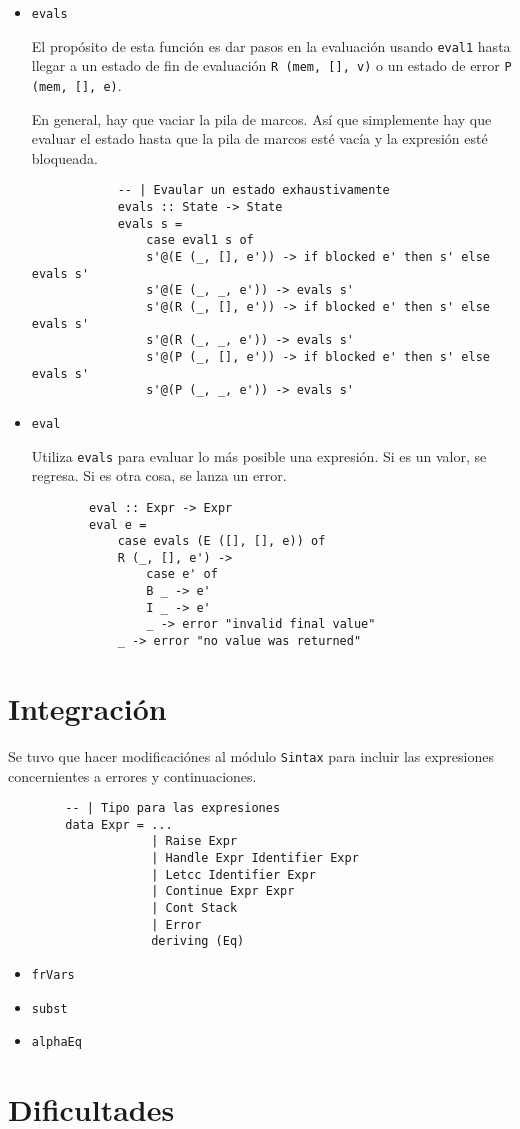 \documentclass{article}
\newcommand{\tx}[1]{\texttt{#1}}
\begin{document}
\begin{itemize}
\begin{itemize}
        \end{itemize}
        \item\tx{evals}

        El propósito de esta función es dar pasos en la evaluación usando 
        \tx{eval1} hasta llegar a un estado de fin de evaluación 
        \tx{R (mem, [], v)} o un estado de error \tx{P (mem, [], e)}.

        En general, hay que vaciar la pila de marcos. Así que simplemente hay 
        que evaluar el estado hasta que la pila de marcos esté vacía y la 
        expresión esté bloqueada.

        \begin{verbatim}
            -- | Evaular un estado exhaustivamente
            evals :: State -> State
            evals s = 
                case eval1 s of
                s'@(E (_, [], e')) -> if blocked e' then s' else evals s'
                s'@(E (_, _, e')) -> evals s'
                s'@(R (_, [], e')) -> if blocked e' then s' else evals s'
                s'@(R (_, _, e')) -> evals s'
                s'@(P (_, [], e')) -> if blocked e' then s' else evals s'
                s'@(P (_, _, e')) -> evals s'
        \end{verbatim}
        \item \tx{eval}

        Utiliza \tx{evals} para evaluar lo más posible una expresión. Si es un 
        valor, se regresa. Si es otra cosa, se lanza un error.

        \begin{verbatim}
        eval :: Expr -> Expr
        eval e = 
            case evals (E ([], [], e)) of
            R (_, [], e') -> 
                case e' of
                B _ -> e'
                I _ -> e'
                _ -> error "invalid final value"
            _ -> error "no value was returned"
        \end{verbatim}
    \end{itemize}

    \section{Integración}

    Se tuvo que hacer modificaciónes al módulo \tx{Sintax} para incluir las 
    expresiones concernientes a errores y continuaciones.

    \begin{verbatim}
        -- | Tipo para las expresiones
        data Expr = ...
                    | Raise Expr
                    | Handle Expr Identifier Expr
                    | Letcc Identifier Expr
                    | Continue Expr Expr
                    | Cont Stack
                    | Error
                    deriving (Eq)
    \end{verbatim}
    \begin{itemize}
        \item \tx{frVars}
        \item \tx{subst}
        \item \tx{alphaEq}
    \end{itemize}

    \section*{Dificultades}
\end{document}
